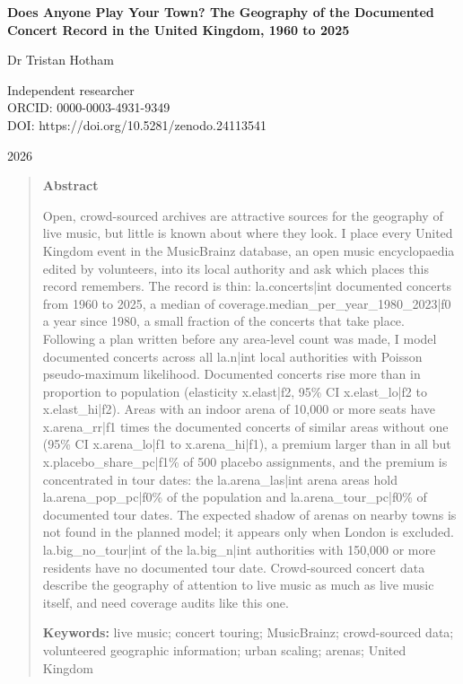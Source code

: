 \documentclass[11pt,a4paper]{article}
\begin{document}
\begin{center}
{\Large\bfseries Does Anyone Play Your Town? The Geography of the Documented Concert Record in the United Kingdom, 1960 to 2025\par}
\vspace{1.2em}
{\large Dr Tristan Hotham\par}
\vspace{0.3em}
{\small Independent researcher\\
ORCID: 0000-0003-4931-9349\\
DOI: https://doi.org/10.5281/zenodo.24113541\par}
\vspace{0.8em}
2026
\end{center}

\begin{quote}
\small
\begin{center}\textbf{Abstract}\end{center}
Open, crowd-sourced archives are attractive sources for the geography of live music, but little is known about where they look. I place every United Kingdom event in the MusicBrainz database, an open music encyclopaedia edited by volunteers, into its local authority and ask which places this record remembers. The record is thin: {{la.concerts|int}} documented concerts from 1960 to 2025, a median of {{coverage.median_per_year_1980_2023|f0}} a year since 1980, a small fraction of the concerts that take place. Following a plan written before any area-level count was made, I model documented concerts across all {{la.n|int}} local authorities with Poisson pseudo-maximum likelihood. Documented concerts rise more than in proportion to population (elasticity {{x.elast|f2}}, 95\% CI {{x.elast_lo|f2}} to {{x.elast_hi|f2}}). Areas with an indoor arena of 10,000 or more seats have {{x.arena_rr|f1}} times the documented concerts of similar areas without one (95\% CI {{x.arena_lo|f1}} to {{x.arena_hi|f1}}), a premium larger than in all but {{x.placebo_share_pc|f1}}\% of 500 placebo assignments, and the premium is concentrated in tour dates: the {{la.arena_las|int}} arena areas hold {{la.arena_pop_pc|f0}}\% of the population and {{la.arena_tour_pc|f0}}\% of documented tour dates. The expected shadow of arenas on nearby towns is not found in the planned model; it appears only when London is excluded. {{la.big_no_tour|int}} of the {{la.big_n|int}} authorities with 150,000 or more residents have no documented tour date. Crowd-sourced concert data describe the geography of attention to live music as much as live music itself, and need coverage audits like this one.

\textbf{Keywords:} live music; concert touring; MusicBrainz; crowd-sourced data; volunteered geographic information; urban scaling; arenas; United Kingdom
\end{quote}
\end{document}
